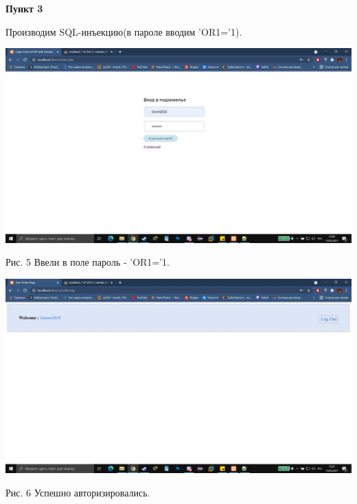 \documentclass[a4paper,14pt]{extarticle}
\begin{document}
    \newpage
    \textbf{Пункт 3}
    \vspace{-3ex}
    \begin{center}
        \singlespacing
        Производим SQL-инъекцию(в пароле вводим 'OR1='1).

        \includegraphics[scale=0.25]{pics/5.jpg}

        Рис. 5 Ввели в поле пароль - 'OR1='1. 
        \vspace{1ex}
        
        \includegraphics[scale=0.25]{pics/6.jpg}

        Рис. 6 Успешно авторизировались.
    \end{center}
\end{document}
